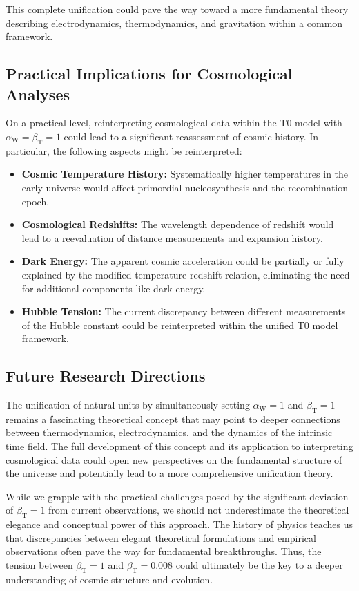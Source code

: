 \documentclass[12pt,a4paper]{article}
\newcommand{\betaT}{\beta_{\text{T}}}
\newcommand{\alphaW}{\alpha_{\text{W}}}
\begin{document}
	This complete unification could pave the way toward a more fundamental theory describing electrodynamics, thermodynamics, and gravitation within a common framework.
	
	\subsection{Practical Implications for Cosmological Analyses}
	
	On a practical level, reinterpreting cosmological data within the T0 model with \(\alphaW = \betaT = 1\) could lead to a significant reassessment of cosmic history. In particular, the following aspects might be reinterpreted:
	
	\begin{itemize}
		\item \textbf{Cosmic Temperature History:} Systematically higher temperatures in the early universe would affect primordial nucleosynthesis and the recombination epoch.
		\item \textbf{Cosmological Redshifts:} The wavelength dependence of redshift would lead to a reevaluation of distance measurements and expansion history.
		\item \textbf{Dark Energy:} The apparent cosmic acceleration could be partially or fully explained by the modified temperature-redshift relation, eliminating the need for additional components like dark energy.
		\item \textbf{Hubble Tension:} The current discrepancy between different measurements of the Hubble constant could be reinterpreted within the unified T0 model framework.
	\end{itemize}
	
	\subsection{Future Research Directions}
	
	The unification of natural units by simultaneously setting \(\alphaW = 1\) and \(\betaT = 1\) remains a fascinating theoretical concept that may point to deeper connections between thermodynamics, electrodynamics, and the dynamics of the intrinsic time field. The full development of this concept and its application to interpreting cosmological data could open new perspectives on the fundamental structure of the universe and potentially lead to a more comprehensive unification theory.
	
	While we grapple with the practical challenges posed by the significant deviation of \(\betaT = 1\) from current observations, we should not underestimate the theoretical elegance and conceptual power of this approach. The history of physics teaches us that discrepancies between elegant theoretical formulations and empirical observations often pave the way for fundamental breakthroughs. Thus, the tension between \(\betaT = 1\) and \(\betaT = 0.008\) could ultimately be the key to a deeper understanding of cosmic structure and evolution.
	
\end{document}

